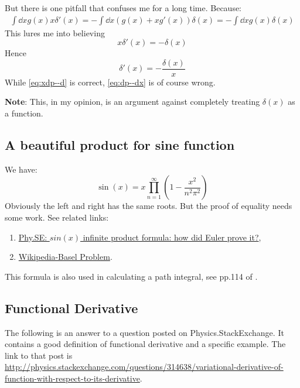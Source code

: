 But there is one pitfall that confuses me for a long time. Because:
\begin{align*}
    \int\dd{x}g(x)x\delta'(x) = -\int\dd{x}(g(x)+xg'(x))\delta(x)
    = -\int\dd{x}g(x)\delta(x)
\end{align*}
This lures me into believing
\begin{equation}
    x\delta'(x) = -\delta(x)
    \label{eq:xdp--d}
\end{equation}
Hence
\begin{equation}
    \delta'(x) = -\frac{\delta(x)}{x}
    \label{eq:dp--dx}
\end{equation}
While \ref{eq:xdp--d} is correct, \ref{eq:dp--dx} is of course wrong.

\textbf{Note}: This, in my opinion, is an argument against completely treating
$\delta(x)$ as a function.
\subsection{A beautiful product for sine function}

We have:
\begin{equation}
    \sin(x) =  x\prod_{n=1}^\infty \left(1-\frac{x^2}{n^2\pi^2}\right)
\end{equation}
Obviously the left and right has the same roots. But the proof of equality needs
some work. See related links:
\begin{enumerate}
    \item  
        \href{http://math.stackexchange.com/questions/674769/sinx-infinite-product-formula-how-did-euler-prove-it}{Phy.SE:
        $sin(x)$ infinite product formula: how did Euler prove it?},
    \item \href{https://en.wikipedia.org/wiki/Basel_problem}{Wikipedia-Basel Problem}.
\end{enumerate}

This formula is also used in calculating a path integral, see pp.114 of
\cite{Altland2010}.

\subsection{Functional Derivative}

The following is an answer to a question posted on Physics.StackExchange. It
contains a good definition of functional derivative and a specific example. The
link to that post is
\url{http://physics.stackexchange.com/questions/314638/variational-derivative-of-function-with-respect-to-its-derivative}.

